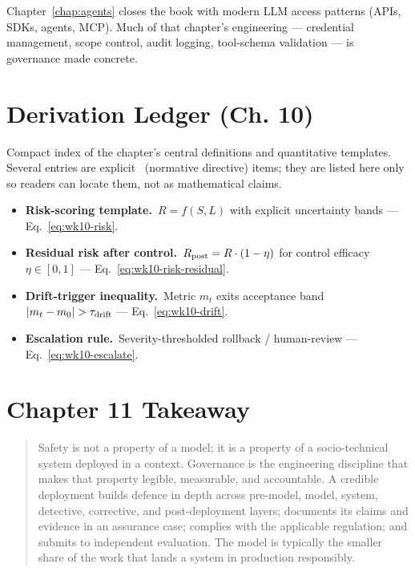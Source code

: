 Chapter~\ref{chap:agents} closes the book with modern LLM access patterns (APIs,
SDKs, agents, MCP). Much of that chapter's engineering ---
credential management, scope control, audit logging,
tool-schema validation --- is governance made concrete.

\section*{Derivation Ledger (Ch. 10)}

\begin{derivledger}
Compact index of the chapter's central definitions and quantitative
templates. Several entries are explicit \Norm\ (normative directive)
items; they are listed here only so readers can locate them, not as
mathematical claims.
\begin{itemize}
  \item \textbf{Risk-scoring template.}\
        $R = f(S, L)$ with explicit uncertainty bands
        --- Eq.~\eqref{eq:wk10-risk}.
  \item \textbf{Residual risk after control.}\
        $R_{\rm post} = R \cdot (1 - \eta)$ for control efficacy
        $\eta \in [0, 1]$ --- Eq.~\eqref{eq:wk10-risk-residual}.
  \item \textbf{Drift-trigger inequality.}\
        Metric $m_t$ exits acceptance band
        $|m_t - m_0| > \tau_{\rm drift}$
        --- Eq.~\eqref{eq:wk10-drift}.
  \item \textbf{Escalation rule.}\
        Severity-thresholded rollback / human-review
        --- Eq.~\eqref{eq:wk10-escalate}.
\end{itemize}
\end{derivledger}

\section{Chapter 11 Takeaway}

\begin{quote}
Safety is not a property of a model; it is a property of a
socio-technical system deployed in a context. Governance is the
engineering discipline that makes that property legible,
measurable, and accountable. A credible deployment builds
defence in depth across pre-model, model, system, detective,
corrective, and post-deployment layers; documents its claims
and evidence in an assurance case; complies with the applicable
regulation; and submits to independent evaluation. The model is
typically the smaller share of the work that lands a system in
production responsibly.
\end{quote}
